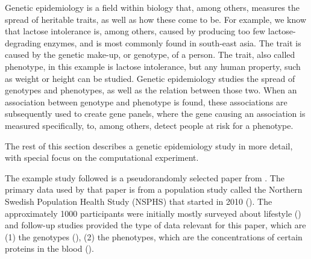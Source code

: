 Genetic epidemiology is a field within biology that, among 
others, measures the spread of heritable traits,
as well as how these come to be.
For example, we know that lactose intolerance is, among others,
caused by producing too few lactose-degrading enzymes,
and is most commonly found in south-east asia.
The trait is caused by the genetic make-up, or genotype, of a person.
The trait, also called phenotype, in this example is lactose intolerance,
but any human property, such as weight or height can be studied.
Genetic epidemiology studies the spread of genotypes and phenotypes,
as well as the relation between those two.
When an association between genotype and phenotype is found,
these associations are subsequently used to 
create gene panels, where the gene causing 
an association is measured specifically, to, among others,
detect people at risk for a phenotype.

The rest of this section describes a genetic epidemiology study 
in more detail, with special focus on the computational experiment.

The example study followed is a pseudorandomly selected paper
from \cite{ahsan2017relative}. The primary data used by that paper is
from a population study called the Northern Swedish Population
Health Study (NSPHS) that started in 2010 (\cite{igl2010northern}). 
The approximately 1000 participants were initially mostly surveyed
about lifestyle (\cite{igl2010northern}) and follow-up studies
provided the type of data relevant for this paper, 
which are (1) the genotypes (\cite{johansson2013identification}),
(2) the phenotypes, which are the concentrations of certain proteins
in the blood (\cite{enroth2014strong,enroth2015effect}).


